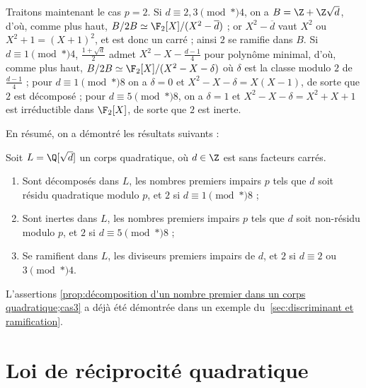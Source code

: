 \documentclass[11pt, %
  title in boldface,
  theorem in new line,
  theorem numbering = section,
  number theorems separately,
  simple name,
]{beaulivre}
\begin{document}
    Traitons maintenant le cas \( p = 2 \). Si \( d \equiv 2, 3 \pmod*{4} \), on a \( B = \Z + \Z \sqrt{d} \), d'où, comme plus haut, \( B/2B \simeq \F_2[X]/(X^2-\overline{d}) \) ; or \( X^2 - \overline{d} \) vaut \( X^2 \) ou \( X^2 + 1 = (X+1)^2 \), et est donc un carré ; ainsi \( 2 \) se ramifie dans \( B \). Si \( d \equiv 1 \pmod*{4} \), \( \frac{1+\sqrt{d}}{2} \) admet \( X^2-X-\frac{d-1}{4} \) pour polynôme minimal, d'où, comme plus haut, \( B/2B \simeq \F_2[X]/(X^2-X-\delta) \) où \( \delta \) est la classe modulo \( 2 \) de \( \frac{d-1}{4} \) ; pour \( d \equiv 1 \pmod*{8} \) on a \( \delta = 0 \) et \( X^2-X-\delta = X(X-1) \), de sorte que \( 2 \) est décomposé ; pour \( d \equiv 5 \pmod*{8} \), on a \( \delta = 1 \) et \( X^2-X-\delta = X^2+X+1 \) est irréductible dans \( \F_2[X] \), de sorte que \( 2 \) est inerte.

    En résumé, on a démontré les résultats suivants :
    \begin{proposition}\label{prop:décomposition d'un nombre premier dans un corps quadratique}
        Soit \( L = \Q[\sqrt{d}] \) un corps quadratique, où \( d \in \Z \) est sans facteurs carrés.
        \begin{enumerate}
            \item \label{prop:décomposition d'un nombre premier dans un corps quadratique;cas1} Sont décomposés dans \( L \), les nombres premiers impairs \( p \) tels que \( d \) soit résidu quadratique modulo \( p \), et \( 2 \) si \( d \equiv 1 \pmod*{8} \) ;
            \item \label{prop:décomposition d'un nombre premier dans un corps quadratique;cas2} Sont inertes dans \( L \), les nombres premiers impairs \( p \) tels que \( d \) soit non-résidu modulo \( p \), et \( 2 \) si \( d \equiv 5 \pmod*{8} \) ;
            \item \label{prop:décomposition d'un nombre premier dans un corps quadratique;cas3} Se ramifient dans \( L \), les diviseurs premiers impairs de \( d \), et \( 2 \) si \( d \equiv 2 \) ou \( 3 \pmod*{4} \).
        \end{enumerate}
    \end{proposition}
    L'assertions \ref{prop:décomposition d'un nombre premier dans un corps quadratique;cas3} a déjà été démontrée dans un exemple du~\cref{sec:discriminant et ramification}.

\section{Loi de réciprocité quadratique}\label{sec:réciprocité quadratique}
\end{document}
